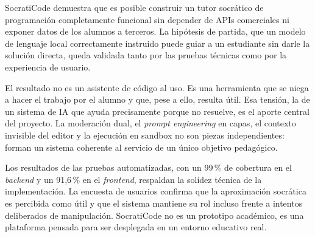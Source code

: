 SocratiCode demuestra que es posible construir un tutor socrático de programación completamente funcional sin depender de APIs comerciales ni exponer datos de los alumnos a terceros. La hipótesis de partida, que un modelo de lenguaje local correctamente instruido puede guiar a un estudiante sin darle la solución directa, queda validada tanto por las pruebas técnicas como por la experiencia de usuario.

El resultado no es un asistente de código al uso. Es una herramienta que se niega a hacer el trabajo por el alumno y que, pese a ello, resulta útil. Esa tensión, la de un sistema de IA que ayuda precisamente porque no resuelve, es el aporte central del proyecto. La moderación dual, el \textit{prompt engineering} en capas, el contexto invisible del editor y la ejecución en sandbox no son piezas independientes: forman un sistema coherente al servicio de un único objetivo pedagógico.

Los resultados de las pruebas automatizadas, con un 99\,\% de cobertura en el \textit{backend} y un 91,6\,\% en el \textit{frontend}, respaldan la solidez técnica de la implementación. La encuesta de usuarios confirma que la aproximación socrática es percibida como útil y que el sistema mantiene su rol incluso frente a intentos deliberados de manipulación. SocratiCode no es un prototipo académico, es una plataforma pensada para ser desplegada en un entorno educativo real.

